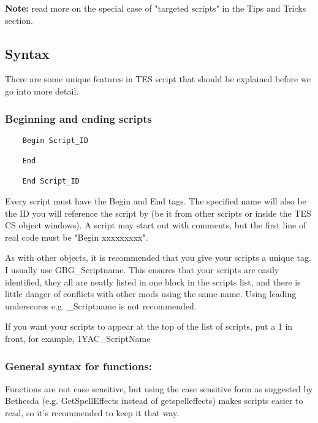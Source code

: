 \textbf{Note:} read more on the special case of "targeted scripts" in
the Tips and Tricks section.

\hypertarget{syntax}{%
\subsection{\texorpdfstring{\hfill\break
Syntax}{ Syntax}}\label{syntax}}

There are some unique features in TES script that should be explained
before we go into more detail.

\hypertarget{beginning-and-ending-scripts}{%
\subsubsection{Beginning and ending
scripts}\label{beginning-and-ending-scripts}}

\begin{lstlisting}
	Begin Script_ID
	
	End
	
	End Script_ID
\end{lstlisting}

Every script must have the Begin and End tags. The specified name will
also be the ID you will reference the script by (be it from other
scripts or inside the TES CS object windows). A script may start out
with comments, but the first line of real code must be "Begin
xxxxxxxxx".

As with other objects, it is recommended that you give your scripts a
unique tag. I usually use GBG\_Scriptname. This ensures that your
scripts are easily identified, they all are neatly listed in one block
in the scripts list, and there is little danger of conflicts with other
mods using the same name. Using leading underscores e.g. \_Scriptname is
not recommended.

If you want your scripts to appear at the top of the list of scripts,
put a 1 in front, for example, 1YAC\_ScriptName

\hypertarget{general-syntax-for-functions}{%
\subsubsection{\texorpdfstring{General syntax for functions:
}{General syntax for functions: }}\label{general-syntax-for-functions}}

Functions are not case sensitive, but using the case sensitive form as
suggested by Bethesda (e.g. GetSpellEffects instead of getspelleffects)
makes scripts easier to read, so it's recommended to keep it that way.

